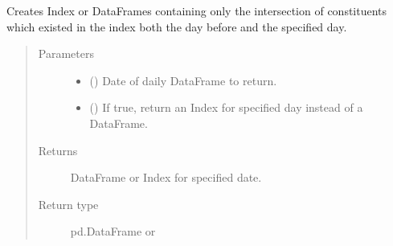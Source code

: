 \documentclass[letterpaper,10pt,english]{report}
\begin{document}
\begin{fulllineitems}
\begin{fulllineitems}
\begin{quote}
\begin{description}
\end{description}\end{quote}

\end{fulllineitems}


\begin{fulllineitems}
\label{\detokenize{index:lgimapy.index.Index.day_persistent_constituents}}
Creates Index or DataFrames containing only the intersection
of constituents which existed in the index both the day before
and the specified day.
\begin{quote}\begin{description}
\item[{Parameters}] \leavevmode\begin{itemize}
\item {} 
 () \textendash{} Date of daily DataFrame to return.

\item {} 
 (\sphinxstyleliteralemphasis{\sphinxupquote{, }}) \textendash{} If true, return an Index for specified day instead
of a DataFrame.

\end{itemize}

\item[{Returns}] \leavevmode
{} \textendash{} DataFrame or Index for specified date.

\item[{Return type}] \leavevmode
pd.DataFrame or {\hyperref[\detokenize{index:lgimapy.index.Index}]{}}

\end{description}\end{quote}

\end{fulllineitems}



\end{fulllineitems}
\end{document}
